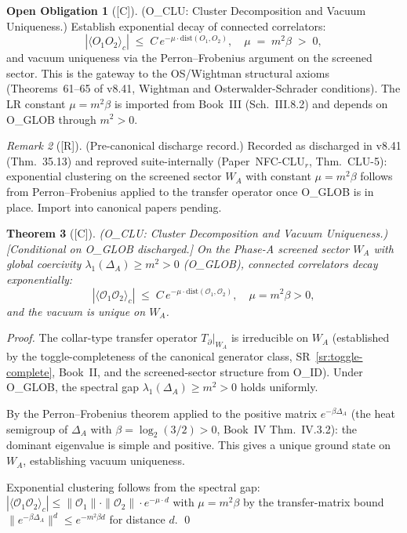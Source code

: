 \documentclass[12pt,oneside]{amsbook}
\theoremstyle{plain}
\newtheorem{theorem}{Theorem}[section]
\theoremstyle{definition}
\newtheorem{obligation}[theorem]{Open Obligation}
\theoremstyle{remark}
\newtheorem{remark}[theorem]{Remark}
\newcommand{\status}[1]{\textup{[#1]}}
\begin{document}
\begin{obligation}[\status{C}]\label{ob:O-CLU}
\textup{(O\_CLU: Cluster Decomposition and Vacuum Uniqueness.)}
Establish exponential decay of connected correlators:
\[
 |\langle O_1 O_2\rangle_c|
 \;\leq\; C\, e^{-\mu\cdot\mathrm{dist}(O_1, O_2)},
 \quad
 \mu \;=\; m^2\beta \;>\; 0,
\]
and vacuum uniqueness via the Perron--Frobenius argument on the
screened sector. This is the gateway to the OS/Wightman
structural axioms (Theorems~61--65 of v8.41, Wightman and
Osterwalder-Schrader conditions). The LR constant $\mu = m^2\beta$
is imported from Book~III (Sch.~III.8.2) and depends on O\_GLOB
through $m^2 > 0$.
\end{obligation}
\begin{remark}[\status{R}]
\textup{(Pre-canonical discharge record.)} Recorded as discharged in v8.41 (Thm.~35.13) and reproved
suite-internally (Paper~NFC-CLU$_r$, Thm.~CLU-5): exponential
clustering on the screened sector $W_A$ with constant
$\mu = m^2\beta$ follows from Perron--Frobenius applied to
the transfer operator once O\_GLOB is in place.
Import into canonical papers pending.
\end{remark}

\begin{theorem}[\status{C}]\label{thm:O-CLU}
\textup{(O\_CLU: Cluster Decomposition and Vacuum Uniqueness.)}
\textup{[Conditional on O\_GLOB discharged.]}\;
On the Phase-A screened sector $W_A$ with global coercivity
$\lambda_1(\Delta_A) \geq m^2 > 0$ (O\_GLOB), connected correlators
decay exponentially:
\[
 |\langle \mathcal{O}_1 \mathcal{O}_2\rangle_c|
 \;\leq\; C\, e^{-\mu\cdot\mathrm{dist}(\mathcal{O}_1,\mathcal{O}_2)},
 \quad \mu = m^2\beta > 0,
\]
and the vacuum is unique on $W_A$.
\end{theorem}

\begin{proof}
The collar-type transfer operator $T_\partial|_{W_A}$ is irreducible on
$W_A$ (established by the toggle-completeness of the canonical generator
class, SR~\ref{sr:toggle-complete}, Book~II, and the screened-sector
structure from O\_ID). Under O\_GLOB, the spectral gap
$\lambda_1(\Delta_A) \geq m^2 > 0$ holds uniformly.

By the Perron--Frobenius theorem applied to the positive matrix
$e^{-\beta\Delta_A}$ (the heat semigroup of $\Delta_A$ with
$\beta = \log_2(3/2) > 0$, Book~IV Thm.~IV.3.2): the dominant
eigenvalue is simple and positive. This gives a unique ground state
on $W_A$, establishing vacuum uniqueness.

Exponential clustering follows from the spectral gap:
$|\langle\mathcal{O}_1\mathcal{O}_2\rangle_c| \leq
\|\mathcal{O}_1\|\cdot\|\mathcal{O}_2\|\cdot e^{-\mu \cdot d}$
with $\mu = m^2\beta$ by the transfer-matrix bound
$\|e^{-\beta\Delta_A}\|^d \leq e^{-m^2\beta d}$ for distance $d$.
\qed
\end{proof}
\end{document}
